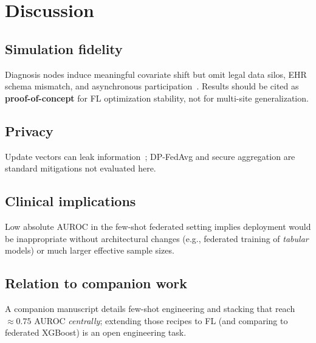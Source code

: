\section{Discussion}
\label{sec:discuss}

\subsection{Simulation fidelity}
Diagnosis nodes induce meaningful covariate shift but omit legal data silos, EHR schema mismatch, and asynchronous participation~\citep{li2020federated}. Results should be cited as \textbf{proof-of-concept} for FL optimization stability, not for multi-site generalization.

\subsection{Privacy}
Update vectors can leak information~\citep{kairouz2021advances}; DP-FedAvg and secure aggregation are standard mitigations not evaluated here.

\subsection{Clinical implications}
Low absolute AUROC in the few-shot federated setting implies deployment would be inappropriate without architectural changes (e.g., federated training of \emph{tabular} models) or much larger effective sample sizes.

\subsection{Relation to companion work}
A companion manuscript details few-shot engineering and stacking that reach $\approx 0.75$ AUROC \emph{centrally}; extending those recipes to FL (and comparing to federated XGBoost) is an open engineering task.
